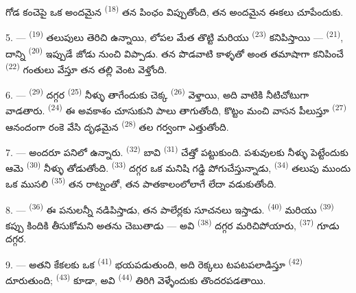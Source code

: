 గోడ కంచెపై ఒక అందమైన  \textsuperscript{(18)} తన పింఛం విప్పుతోంది, తన అందమైన
ఈకలు చూపేందుకు.

\VUsaut{3.0mm}

5. ---  \textsuperscript{(19)} తలుపులు తెరిచి ఉన్నాయి, లోపల మేత తొట్టి
మరియు  \textsuperscript{(23)} కనిపిస్తాయి — 
\textsuperscript{(21)}, దాన్ని  \textsuperscript{(20)} ఇప్పుడే జోడు
నుంచి విప్పాడు. తన పొడవాటి కాళ్ళతో అంత తమాషాగా కనిపించే 
\textsuperscript{(22)} గంతులు వేస్తూ తన తల్లి వెంట వెళ్తోంది.

6. ---  \textsuperscript{(29)} దగ్గర  \textsuperscript{(25)} నీళ్ళు
తాగేందుకు చెక్క  \textsuperscript{(26)} వెళ్తాయి, అది వాటికి నీటిచోటుగా
వాడతారు.  \textsuperscript{(24)} ఈ అవకాశం చూసుకుని పాలు తాగుతోంది, కొట్టం మంచి
వాసన పీలుస్తూ  \textsuperscript{(27)} ఆనందంగా రంకె వేసి దృఢమైన 
\textsuperscript{(28)} తల గర్వంగా ఎత్తుతోంది.

7. --- అందరూ పనిలో ఉన్నారు.  \textsuperscript{(32)} బావి 
\textsuperscript{(31)} చేత్తో పట్టుకుంది. పశువులకు నీళ్ళు పెట్టేందుకు ఆమె 
\textsuperscript{(30)} నీళ్ళు తోడుతోంది.  \textsuperscript{(33)} దగ్గర ఒక మనిషి
గడ్డి పోగుచేస్తున్నాడు,  \textsuperscript{(34)} తలుపు ముందు ఒక ముసలి
 \textsuperscript{(35)} తన రాట్నంతో, తన  పాతకాలంలోలాగే
 లేదా  వడుకుతోంది.

\VUsaut{3.0mm}
\VUsaut{3.0mm}

8. ---  \textsuperscript{(36)} ఈ పనులన్నీ నడిపిస్తాడు, తన పాలేర్లకు సూచనలు
ఇస్తాడు.  \textsuperscript{(40)} మరియు  \textsuperscript{(39)}
కప్పు కిందికి తీసుకోమని అతను చెబుతాడు — అవి  \textsuperscript{(38)} దగ్గర
మరిచిపోయారు,  \textsuperscript{(37)} గూడు దగ్గర.

9. --- అతని కేకలకు ఒక  \textsuperscript{(41)} భయపడుతుంది, అది రెక్కలు
టపటపలాడిస్తూ  \textsuperscript{(42)} దూరుతుంది; 
\textsuperscript{(43)} కూడా, అవి  \textsuperscript{(44)} తిరిగి
వెళ్ళేందుకు తొందరపడతాయి.

